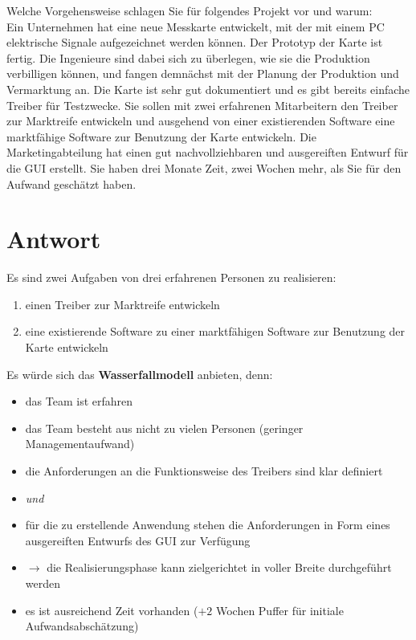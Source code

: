 Welche Vorgehensweise schlagen Sie für folgendes Projekt vor und warum:\\

\noindent
Ein Unternehmen hat eine neue Messkarte entwickelt, mit der mit einem PC elektrische Signale aufgezeichnet werden können.
Der Prototyp der Karte ist fertig.
Die Ingenieure sind dabei sich zu überlegen, wie sie die Produktion verbilligen können, und fangen demnächst mit der Planung der Produktion und Vermarktung an.
Die Karte ist sehr gut dokumentiert und es gibt bereits einfache Treiber für Testzwecke.
Sie sollen mit zwei erfahrenen Mitarbeitern den Treiber zur Marktreife entwickeln und ausgehend von einer existierenden Software eine marktfähige Software zur Benutzung der Karte entwickeln.
Die Marketingabteilung hat einen gut nachvollziehbaren und ausgereiften Entwurf für die GUI erstellt.
Sie haben drei Monate Zeit, zwei Wochen mehr, als Sie für den Aufwand geschätzt haben.

\section*{Antwort}
Es sind zwei Aufgaben von drei erfahrenen Personen zu realisieren:

\begin{enumerate}
    \item einen Treiber zur Marktreife entwickeln
    \item eine existierende Software zu einer marktfähigen Software zur Benutzung der Karte entwickeln
\end{enumerate}


\noindent
Es würde sich das \textbf{Wasserfallmodell} anbieten, denn:

\begin{itemize}
    \item das Team ist erfahren
    \item das Team besteht aus nicht zu vielen Personen (geringer Managementaufwand)
    \item die Anforderungen an die Funktionsweise des Treibers sind klar definiert
    \item[] \textit{und}
    \item für die zu erstellende Anwendung stehen die Anforderungen in Form eines ausgereiften Entwurfs des GUI zur Verfügung
    \item[] $\rightarrow$ die Realisierungsphase kann zielgerichtet in voller Breite durchgeführt werden
    \item es ist ausreichend Zeit vorhanden ($+2$ Wochen Puffer für initiale Aufwandsabschätzung)
\end{itemize}

